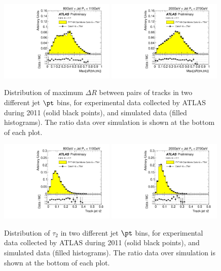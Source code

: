 \begin{figure}[tp]
\centering
\includegraphics[width=0.49\textwidth]{FIGS/dataMC/FullDataVarDRmaxPT080.pdf}
\includegraphics[width=0.49\textwidth]{FIGS/dataMC/FullDataVarDRmaxPT200.pdf}
\caption{ Distribution of maximum $\Delta R$ between pairs of tracks in two different jet $\pt$ bins, for experimental data  collected by ATLAS during 2011 (solid black points), and simulated data (filled histograms). The ratio data over simulation is shown at the bottom of each plot.}
\label{fig:datamcinputvars2DRMAX}
\end{figure}


\begin{figure}[tp]
\centering
\includegraphics[width=0.49\textwidth]{FIGS/dataMC/FullDataVarTau2PT080.pdf}
\includegraphics[width=0.49\textwidth]{FIGS/dataMC/FullDataVarTau2PT200.pdf}  
\caption{ Distribution of $\tau_2$ in two different jet $\pt$ bins, for experimental data  collected by ATLAS during 2011 (solid black points), and simulated data (filled histograms). The ratio data over simulation is shown at the bottom of each plot.}
\label{fig:datamcinputvars2TAU2}
\end{figure}

